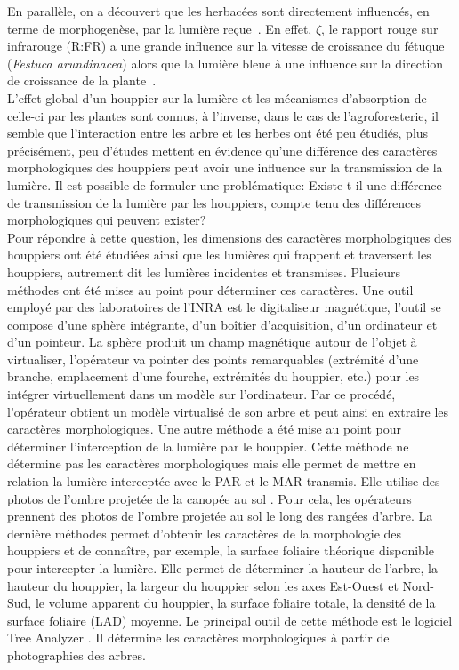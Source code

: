 \documentclass[12pt]{report}
\begin{document}
En parallèle, on a découvert que les herbacées sont directement influencés, en
terme de morphogenèse, par la lumière reçue~\citep{MAR_ref16}. En effet, $\zeta$,
le rapport rouge sur infrarouge (R:FR) a une grande influence sur la vitesse de
croissance du fétuque (\textit{Festuca arundinacea}) alors que la lumière bleue
à une influence sur la direction de croissance de la plante~\citep{BioVeg_ref43}.\\

L'effet global d'un houppier sur la lumière et les mécanismes d'absorption de
celle-ci par les plantes sont connus, à l'inverse, dans le cas de
l'agroforesterie, il semble que l'interaction entre les arbre et les herbes ont
été peu étudiés, plus précisément, peu d'études mettent en évidence qu'une
différence des caractères morphologiques des houppiers peut avoir une influence sur
la transmission de la lumière. Il est possible de formuler une
problématique: Existe-t-il une différence de transmission de la lumière par les
houppiers, compte tenu des différences morphologiques qui peuvent exister?\\

Pour répondre à cette question, les dimensions des caractères morphologiques des
houppiers ont été étudiées ainsi que les lumières qui frappent et traversent les
houppiers, autrement dit les
lumières incidentes et transmises. Plusieurs méthodes ont été mises au
point pour déterminer ces caractères. Une outil employé par des laboratoires de
l'INRA est le digitaliseur magnétique, l'outil se compose d'une sphère
intégrante, d'un boîtier d'acquisition, d'un ordinateur et d'un pointeur. La
sphère produit un champ magnétique autour de l'objet à virtualiser, l'opérateur
va pointer des points remarquables (extrémité d'une branche, emplacement d'une
fourche, extrémités du houppier, etc.) pour les intégrer virtuellement dans un
modèle sur l'ordinateur. Par ce procédé, l'opérateur obtient un modèle
virtualisé de son arbre et peut ainsi en extraire les caractères morphologiques.
Une autre méthode a été mise au point pour déterminer l'interception de la lumière par
le houppier. Cette méthode ne détermine pas les caractères
morphologiques mais elle permet de mettre en relation la lumière interceptée avec
le PAR et le MAR transmis. Elle utilise des photos de l'ombre projetée de la canopée au
sol \citep{MAR_ref32}. Pour cela, les opérateurs prennent des photos de l'ombre
projetée au sol le long des rangées d'arbre. La dernière méthodes permet
d'obtenir les caractères de la morphologie des houppiers et de connaître, par
exemple, la surface foliaire théorique disponible pour intercepter la lumière.
Elle permet de déterminer la hauteur de l'arbre, la hauteur du houppier, la
largeur du houppier selon les axes Est-Ouest et Nord-Sud, le volume apparent du
houppier, la surface foliaire totale, la densité de la surface foliaire (LAD)
moyenne. Le principal outil de cette méthode est le logiciel Tree Analyzer
\citep{MAR_ref24,MAR_ref25}. Il détermine les caractères morphologiques à
partir de photographies des arbres.
\end{document}

